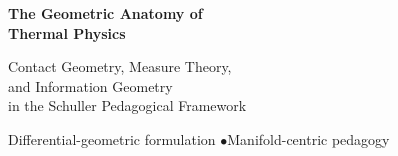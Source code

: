 \documentclass[12pt,a4paper]{book}
\theoremstyle{definition}
\theoremstyle{plain}
\theoremstyle{remark}
\begin{document}
\begin{titlepage}
\centering
\vspace*{3cm}
{\Huge\bfseries The Geometric Anatomy of\\[0.4em] Thermal Physics\par}
\vspace{2cm}
{\Large Contact Geometry, Measure Theory,\\[0.3em]
and Information Geometry\\[0.3em]
in the Schuller Pedagogical Framework\par}
\vspace{3cm}
{\large Differential-geometric formulation \quad$\bullet$\quad Manifold-centric pedagogy\par}
\vfill
\end{titlepage}

\frontmatter
\tableofcontents

\mainmatter











\end{document}
